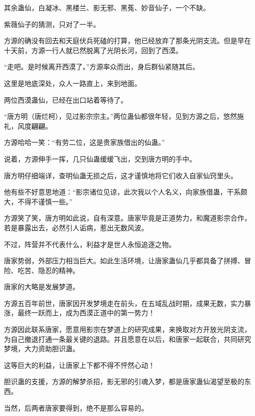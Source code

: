 \begin{this_body}
其余蛊仙，白凝冰、黑楼兰、影无邪、黑菟、妙音仙子，一个不缺。

紫薇仙子的猜测，只对了一半。

方源的确没有回去和天庭伏兵死磕的打算，他已经放弃了那条光阴支流。但是早在十天前，方源一行人就已然脱离了光阴长河，回到了西漠。

“走吧。是时候离开西漠了。”方源率众而出，身后群仙紧随其后。

这里是地底深处，众人一路直上，来到地面。

两位西漠蛊仙，已经在出口站着等待了。

“唐方明（唐烂柯），见过影宗宗主。”两位蛊仙都很年轻，见到方源之后，悠然施礼，风度翩翩。

方源哈哈一笑：“有劳二位，这是贵家族借出的仙蛊。”

说着，方源伸手一挥，几只仙蛊缓缓飞出，交到唐方明的手中。

唐方明仔细端详，查明仙蛊无损之后，这才谨慎地将它们收入自家仙窍里头。

他有些不好意思地道：“影宗诸位见谅，此次我以个人名义，向家族借蛊，干系颇大，不得不谨慎一些。”

方源笑了笑，唐方明如此说，自有深意。唐家毕竟是正道势力，和魔道影宗合作，若是暴露出去，必然引人诟病，惹出无数风波。

不过，阵营并不代表什么，利益才是世人永恒追逐之物。

唐家势弱，外部压力相当巨大。如此生活环境，让唐家蛊仙几乎都具备了拼搏、冒险、吃苦、隐忍的精神。

唐家的大略是发展梦道。

方源五百年前世，唐家因开发梦境走在前头，在五域乱战时期，成果无数，实力暴涨，最终一跃而上，成为西漠正道中的第一势力！

方源因此联系唐家，愿意用影宗在梦道上的研究成果，来换取对方开放光阴支流，为自己撤退打通一条最关键的退路。并且愿意在以后，和唐家一起联合，共同研究梦境，大力资助胆识蛊。

这等巨大的利益，让唐家上下都不得不怦然心动！

胆识蛊的支援，方源的解梦杀招，影无邪的引魂入梦，都是唐家蛊仙渴望至极的东西。

当然，后两者唐家要得到，绝不是那么容易的。

\end{this_body}

